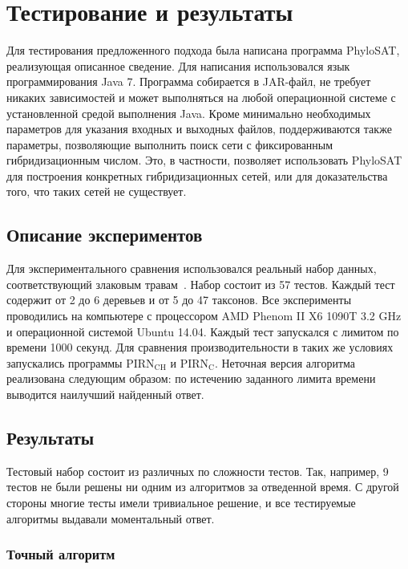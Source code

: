 \FloatBarrier
\chapter{Тестирование и результаты}

Для тестирования предложенного подхода была написана программа PhyloSAT, реализующая описанное сведение.
Для написания использовался язык программирования Java 7.
Программа собирается в JAR-файл, не требует никаких зависимостей и может выполняться на любой операционной системе с установленной средой выполнения Java.
Кроме минимально необходимых параметров для указания входных и выходных файлов, поддерживаются также параметры, позволяющие выполнить поиск сети с фиксированным гибридизационным числом.
Это, в частности, позволяет использовать PhyloSAT для построения конкретных гибридизационных сетей, или для доказательства того, что таких сетей не существует.

\FloatBarrier
\section{Описание экспериментов}

Для экспериментального сравнения использовался реальный набор данных, соответствующий злаковым травам~\cite{grass2001phylogeny}.
Набор состоит из 57 тестов.
Каждый тест содержит от 2 до 6 деревьев и от 5 до 47 таксонов.
Все эксперименты проводились на компьютере с процессором AMD Phenom II X6 1090T 3.2 GHz и операционной системой Ubuntu 14.04.
Каждый тест запускался с лимитом по времени 1000 секунд.
Для сравнения производительности в таких же условиях запускались программы $\mathrm{PIRN_{CH}}$ и $\mathrm{PIRN_C}$.
Неточная версия алгоритма реализована следующим образом: по истечению заданного лимита времени выводится наилучший найденный ответ.

\FloatBarrier
\section{Результаты}

Тестовый набор состоит из различных по сложности тестов.
Так, например, 9 тестов не были решены ни одним из алгоритмов за отведенной время.
С другой стороны многие тесты имели тривиальное решение, и все тестируемые алгоритмы выдавали моментальный ответ.

\subsection{Точный алгоритм}

